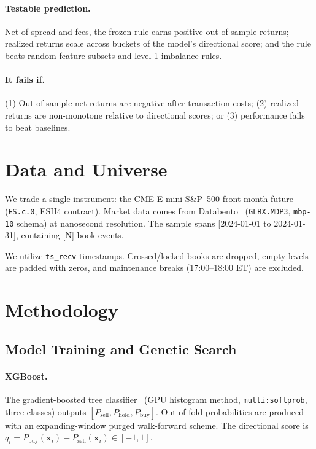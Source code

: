 \documentclass[11pt,letterpaper]{article}
\begin{document}
\paragraph{Testable prediction.} Net of spread and fees, the frozen rule earns positive out-of-sample returns; realized returns scale across buckets of the model's directional score; and the rule beats random feature subsets and level-1 imbalance rules.
 
\paragraph{It fails if.} (1) Out-of-sample net returns are negative after transaction costs; (2) realized returns are non-monotone relative to directional scores; or (3) performance fails to beat baselines.
 
\section{Data and Universe}
We trade a single instrument: the CME E-mini S\&P~500 front-month future (\texttt{ES.c.0}, ESH4 contract). Market data comes from Databento~\cite{Databento} (\texttt{GLBX.MDP3}, \texttt{mbp-10} schema) at nanosecond resolution. The sample spans [2024-01-01 to 2024-01-31], containing [N] book events. 

We utilize \texttt{ts\_recv} timestamps. Crossed/locked books are dropped, empty levels are padded with zeros, and maintenance breaks (17:00--18:00 ET) are excluded.
 
\section{Methodology}
\subsection{Model Training and Genetic Search}
\paragraph{XGBoost.} The gradient-boosted tree classifier~\cite{chen2016xgboost}
(GPU histogram method, \texttt{multi:softprob}, three classes) outputs
$[P_{\text{sell}},P_{\text{hold}},P_{\text{buy}}]$. Out-of-fold probabilities are produced with an expanding-window purged walk-forward scheme. The directional score is $q_i = P_{\text{buy}}(\mathbf{x}_i) - P_{\text{sell}}(\mathbf{x}_i) \in [-1,1]$.
 
\end{document}

